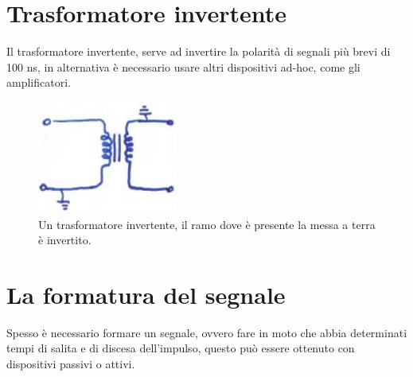 \section{Trasformatore invertente}
Il trasformatore invertente, serve ad invertire la polarit\`a di segnali pi\`u brevi di 100 ns, in alternativa \`e necessario usare altri dispositivi ad-hoc, come gli amplificatori.
\begin{figure}[htbp]
\begin{center}
	\includegraphics[scale=1.00]{./Immagini/TrasformatoreInvertente.png}
\caption{Un trasformatore invertente, il ramo dove \`e presente la messa a terra \`e invertito.}
\end{center}
\end{figure}
\section{La formatura del segnale}
Spesso \`e necessario formare un segnale, ovvero fare in moto che abbia determinati tempi di salita e di discesa dell'impulso,
questo pu\`o essere ottenuto con dispositivi passivi o attivi.
